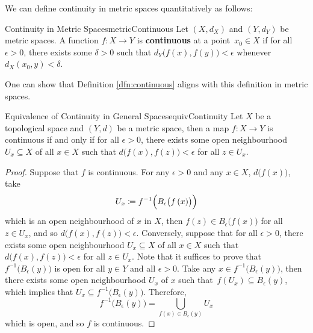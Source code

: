 \documentclass[math]{amznotes}
\theoremstyle{remark}
\begin{document}
We can define continuity in metric spaces quantitatively as follows:
\begin{dfnbox}{Continuity in Metric Spaces}{metricContinuous}
    Let $\left(X, d_X\right)$ and $\left(Y, d_Y\right)$ be metric spaces. A function $f \colon X \to Y$ is {\color{red} \textbf{continuous}} at a point~$x_0 \in X$ if for all $\epsilon > 0$, there exists some $\delta > 0$ such that $d_Y\bigl(f\left(x\right), f\left(y\right)\bigr) < \epsilon$ whenever~$d_X\left(x_0, y\right) < \delta$.
\end{dfnbox}
One can show that Definition \ref{dfn:continuous} aligns with this definition in metric spaces.
\begin{probox}{Equivalence of Continuity in General Spaces}{equivContinuity}
    Let $X$ be a topological space and $\left(Y, d\right)$ be a metric space, then a map $f \colon X \to Y$ is continuous if and only if for all $\epsilon > 0$, there exists some open neighbourhood $U_x \subseteq X$ of all $x \in X$ such that $d\bigl(f\left(x\right), f\left(z\right)\bigr) < \epsilon$ for all $z \in U_x$.
    \tcblower
    \begin{proof}
        Suppose that $f$ is continuous. For any $\epsilon > 0$ and any $x \in X$, $d\bigl(f\left(x\right)\bigr)$, take 
        \begin{equation*}
            U_x \coloneqq f^{-1}\Bigl(B_{\epsilon}\bigl(f\left(x\right)\bigr)\Bigr)
        \end{equation*}
        which is an open neighbourhood of $x$ in $X$, then $f\left(z\right) \in B_{\epsilon}\bigl(f\left(x\right)\bigr)$ for all $z \in U_x$, and so $d\bigl(f\left(x\right), f\left(z\right)\bigr) < \epsilon$. Conversely, suppose that for all $\epsilon > 0$, there exists some open neighbourhood $U_x \subseteq X$ of all $x \in X$ such that $d\bigl(f\left(x\right), f\left(z\right)\bigr) < \epsilon$ for all $z \in U_x$. Note that it suffices to prove that $f^{-1}\bigl(B_{\epsilon}\left(y\right)\bigr)$ is open for all $y \in Y$ and all $\epsilon > 0$. Take any $x \in f^{-1}\bigl(B_{\epsilon}\left(y\right)\bigr)$, then there exists some open neighbourhood $U_x$ of $x$ such that~$f\left(U_x\right) \subseteq B_{\epsilon}\left(y\right)$, which implies that $U_x \subseteq f^{-1}\bigl(B_{\epsilon}\left(y\right)\bigr)$. Therefore, 
        \begin{equation*}
            f^{-1}\bigl(B_{\epsilon}\left(y\right)\bigr) = \bigcup_{f\left(x\right) \in B_{\epsilon}\left(y\right)}U_x
        \end{equation*}
        which is open, and so $f$ is continuous.
    \end{proof}
\end{probox}
\end{document}
